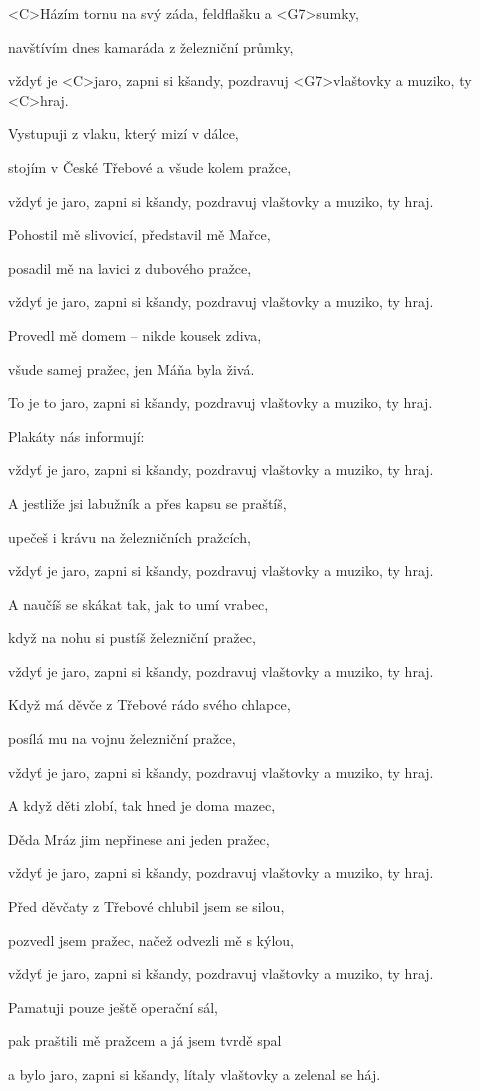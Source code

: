 

\zs
<C>Házím tornu na svý záda, feldflašku a <G7>sumky,

navštívím dnes kamaráda z železniční průmky,

vždyť je <C>jaro, zapni si kšandy,
pozdravuj <G7>vlaštovky a muziko, ty <C>hraj.
\ks

\zs
Vystupuji z vlaku, který mizí v dálce,

stojím v České Třebové a všude kolem pražce,

vždyť je jaro, zapni si kšandy,
pozdravuj vlaštovky a muziko, ty hraj.
\ks

\zs
Pohostil mě slivovicí, představil mě Mařce,

posadil mě na lavici z dubového pražce,

vždyť je jaro, zapni si kšandy,
pozdravuj vlaštovky a muziko, ty hraj.
\ks

\zs
Provedl mě domem -- nikde kousek zdiva,

všude samej pražec, jen Máňa byla živá.

To je to jaro, zapni si kšandy,
pozdravuj vlaštovky a muziko, ty hraj.
\ks

\zs
Plakáty nás informují: 

vždyť je jaro, zapni si kšandy,
pozdravuj vlaštovky a muziko, ty hraj.
\ks

\zs
A jestliže jsi labužník a přes kapsu se praštíš,

upečeš i krávu na železničních pražcích,

vždyť je jaro, zapni si kšandy,
pozdravuj vlaštovky a muziko, ty hraj.
\ks

\zs
A naučíš se skákat tak, jak to umí vrabec,

když na nohu si pustíš železniční pražec,

vždyť je jaro, zapni si kšandy,
pozdravuj vlaštovky a muziko, ty hraj.
\ks

\zs
Když má děvče z Třebové rádo svého chlapce,

posílá mu na vojnu železniční pražce,

vždyť je jaro, zapni si kšandy,
pozdravuj vlaštovky a muziko, ty hraj.
\ks

\zs
A když děti zlobí, tak hned je doma mazec,

Děda Mráz jim nepřinese ani jeden pražec,

vždyť je jaro, zapni si kšandy,
pozdravuj vlaštovky a muziko, ty hraj.
\ks

\zs
Před děvčaty z Třebové chlubil jsem se silou,

pozvedl jsem pražec, načež odvezli mě s kýlou,

vždyť je jaro, zapni si kšandy,
pozdravuj vlaštovky a muziko, ty hraj.
\ks

\zs
Pamatuji pouze ještě operační sál,

pak praštili mě pražcem a já jsem tvrdě spal

a bylo jaro, zapni si kšandy,
lítaly vlaštovky a zelenal se háj.
\ks

\kp
